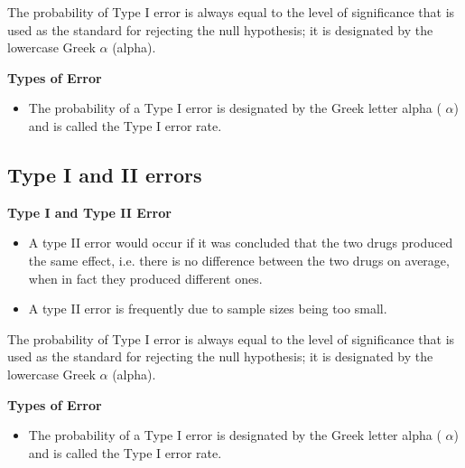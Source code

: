 \documentclass[]{report}
\begin{document}
The probability of Type I error is always equal to the level of significance that is used as the standard for rejecting
the null hypothesis; it is designated by the lowercase Greek $\alpha$ (alpha).




\textbf{Types of Error}
\begin{itemize}
\item The probability of a Type I error is designated by the Greek letter alpha ( $\alpha$) and is called the Type I error rate. 

\end{itemize}






\subsection{Type I and II errors}






\textbf{Type I and Type II Error}
\begin{itemize}

\item A type II error would occur if it was concluded that the two drugs produced the same effect, i.e. there is no difference between the two drugs on average, when in fact they produced different ones.
\item A type II error is frequently due to sample sizes being too small.
\end{itemize}



The probability of Type I error is always equal to the level of significance that is used as the standard for rejecting
the null hypothesis; it is designated by the lowercase Greek $\alpha$ (alpha).





\textbf{Types of Error}
\begin{itemize}
\item The probability of a Type I error is designated by the Greek letter alpha ( $\alpha$) and is called the Type I error rate.

\end{itemize}
\end{document}
